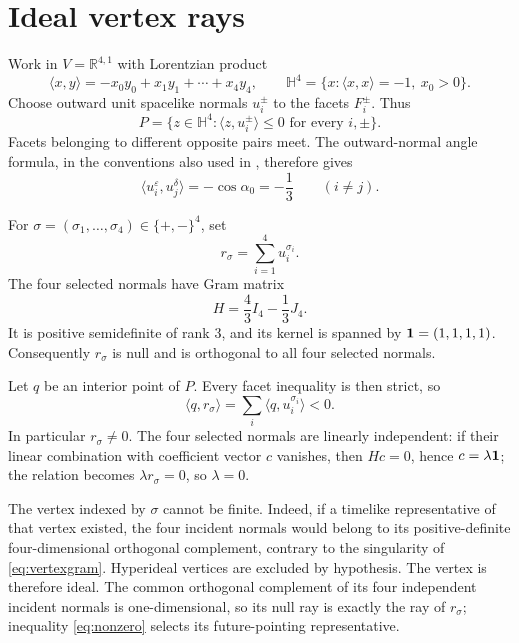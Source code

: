 \documentclass[11pt]{article}
\begin{document}
\section{Ideal vertex rays}

Work in $V=\mathbb R^{4,1}$ with Lorentzian product
\[
 \langle x,y\rangle=-x_0y_0+x_1y_1+\cdots+x_4y_4,
 \qquad
 \mathbb H^4=\{x:\langle x,x\rangle=-1,\ x_0>0\}.
\]
Choose outward unit spacelike normals $u_i^\pm$ to the facets
$F_i^\pm$.  Thus
\[
 P=\{z\in\mathbb H^4:\langle z,u_i^\pm\rangle\leq0
       \text{ for every }i,\pm\}.
\]
Facets belonging to different opposite pairs meet.  The outward-normal
angle formula, in the conventions also used in \cite[Section~2.1]{Egorov2026},
therefore gives
\begin{equation}\label{eq:cross}
 \langle u_i^\varepsilon,u_j^\delta\rangle=-\cos\alpha _0=-\frac13
 \qquad (i\ne j).
\end{equation}

For $\sigma=(\sigma_1,\ldots,\sigma_4)\in\{+,-\}^4$, set
\[
 r_\sigma=\sum_{i=1}^4 u_i^{\sigma_i}.
\]
The four selected normals have Gram matrix
\begin{equation}\label{eq:vertexgram}
 H=\frac43I_4-\frac13J_4.
\end{equation}
It is positive semidefinite of rank $3$, and its kernel is spanned by
${\bf1}=(1,1,1,1)$.  Consequently $r_\sigma$ is null and is orthogonal
to all four selected normals.

Let $q$ be an interior point of $P$.  Every facet inequality is then
strict, so
\begin{equation}\label{eq:nonzero}
 \langle q,r_\sigma\rangle
   =\sum_i\langle q,u_i^{\sigma_i}\rangle<0.
\end{equation}
In particular $r_\sigma\ne0$.  The four selected normals are linearly
independent: if their linear combination with coefficient vector $c$
vanishes, then $Hc=0$, hence $c=\lambda{\bf1}$; the relation becomes
$\lambda r_\sigma=0$, so $\lambda=0$.

The vertex indexed by $\sigma$ cannot be finite.  Indeed, if a timelike
representative of that vertex existed, the four incident normals would
belong to its positive-definite four-dimensional orthogonal complement,
contrary to the singularity of \eqref{eq:vertexgram}.  Hyperideal
vertices are excluded by hypothesis.  The vertex is therefore ideal.
The common orthogonal complement of its four independent incident
normals is one-dimensional, so its null ray is exactly the ray of
$r_\sigma$; inequality \eqref{eq:nonzero} selects its future-pointing
representative.
\end{document}
